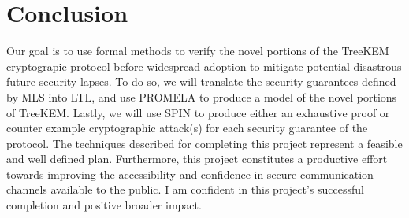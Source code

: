 \documentclass[12pt,twocolumn]{article}
\begin{document}
	\section*{Conclusion}
	
	Our goal is to use formal methods to verify the novel portions of the TreeKEM cryptograpic protocol before widespread adoption to mitigate potential disastrous future security lapses. To do so, we will translate the security guarantees defined by MLS into LTL, and use PROMELA to produce a model of the novel portions of TreeKEM. Lastly, we will use SPIN to produce either an exhaustive proof or counter example cryptographic attack(s) for each security guarantee of the protocol. The techniques described for completing this project represent a feasible and well defined plan. Furthermore, this project constitutes a productive effort towards improving the accessibility and confidence in secure communication channels available to the public. I am confident in this project's successful completion and positive broader impact.
	
	\onecolumn
	
	
\end{document}
